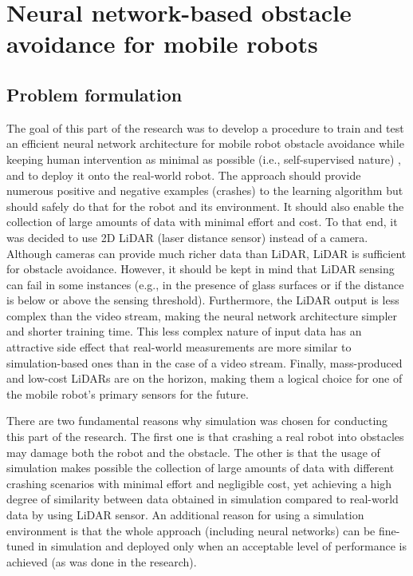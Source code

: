 \section{Neural network-based obstacle avoidance for mobile robots}
\label{sec:MMAvoidance}

\subsection{Problem formulation}

The goal of this part of the research was to develop a procedure to train and test an efficient neural network architecture for mobile robot obstacle avoidance while keeping human intervention as minimal as possible (i.e., self-supervised nature) \cite{Kruzic2020a}, and to deploy it onto the real-world robot. The approach should provide numerous positive and negative examples (crashes) to the learning algorithm but should safely do that for the robot and its environment.  It should also enable the collection of large amounts of data with minimal effort and cost. To that end, it was decided to use 2D LiDAR (laser distance sensor) instead of a camera. Although cameras can provide much richer data than LiDAR, LiDAR is sufficient for obstacle avoidance. However, it should be kept in mind that LiDAR sensing can fail in some instances (e.g., in the presence of glass surfaces or if the distance is below or above the sensing threshold). Furthermore, the LiDAR output is less complex than the video stream, making the neural network architecture simpler and shorter training time. This less complex nature of input data has an attractive side effect that real-world measurements are more similar to simulation-based ones than in the case of a video stream. Finally, mass-produced and low-cost LiDARs are on the horizon, making them a logical choice for one of the mobile robot's primary sensors for the future.

There are two fundamental reasons why simulation was chosen for conducting this part of the research. The first one is that crashing a real robot into obstacles may damage both the robot and the obstacle. The other is that the usage of simulation makes possible the collection of large amounts of data with different crashing scenarios with minimal effort and negligible cost, yet achieving a high degree of similarity between data obtained in simulation compared to real-world data by using LiDAR sensor. An additional reason for using a simulation environment is that the whole approach (including neural networks) can be fine-tuned in simulation and deployed only when an acceptable level of performance is achieved (as was done in the research).


